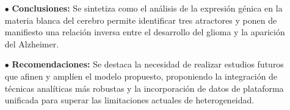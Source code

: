 \begin{itemize}
	\item[$\bullet$] \textbf{Conclusiones:} Se sintetiza como el análisis de la expresión génica en la materia blanca del cerebro permite identificar tres atractores y ponen de manifiesto una relación inversa entre el desarrollo del glioma y la aparición del Alzheimer. 
	
	\item[$\bullet$] \textbf{Recomendaciones:} Se destaca la necesidad de realizar estudios futuros que afinen y amplíen el modelo propuesto, proponiendo la integración de técnicas analíticas más robustas y la incorporación de datos de plataforma unificada para superar las limitaciones actuales de heterogeneidad.
	
	
\end{itemize}